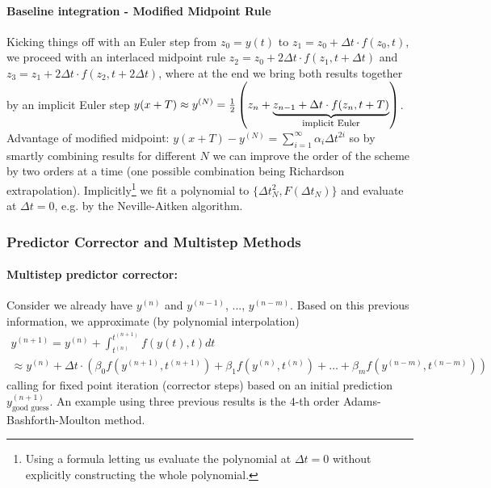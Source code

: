 \paragraph*{Baseline integration - Modified Midpoint Rule} Kicking things off with an Euler step from
$z_0 = y(t)$ to $z_1 = z_0 + \Delta t \cdot f(z_0, t)$, we proceed
with an interlaced midpoint rule $z_2 = z_0 + 2 \Delta t \cdot f(z_1, t + \Delta t)$ and
$z_3 = z_1 + 2 \Delta t \cdot f(z_2, t + 2 \Delta t)$, where at the end we bring
both results together by an implicit Euler step $y(x + T) \approx y^{(N)} = \frac{1}{2} \left(z_{n} + \explain{z_{n-1} + \Delta t \cdot f(z_n, t + T)}{implicit Euler}\right)$.
\textcolor{green1}{Advantage of modified midpoint:} $y(x+T) - y^{(N)} = \sum_{i=1}^{\infty} \alpha_i \Delta t^{2i}$
so by smartly combining results for different $N$ we can improve the order of the scheme by
two orders at a time (one possible combination being Richardson extrapolation). Implicitly\footnote{Using a formula
letting us evaluate the polynomial at $\Delta t = 0$ without explicitly constructing the whole polynomial.} we fit
a polynomial to $\{\Delta t_N^2, F(\Delta t_N)\}$ and evaluate at $\Delta t = 0$, e.g. by the
Neville-Aitken algorithm.

\subsubsection*{Predictor Corrector and Multistep Methods}
\paragraph*{Multistep predictor corrector:} Consider we already have $y^{(n)}$ and $y^{(n-1)}$, ..., $y^{(n-m)}$.
Based on this previous information, we approximate (by polynomial interpolation)
\begin{equation}
    \begin{gathered}
        y^{(n+1)} = y^{(n)} + \int_{t^{(n)}}^{t^{(n+1)}} f(y(t), t) dt \\
        \approx y^{(n)} + \Delta t \cdot \left( \beta_0 f\left(y^{(n + 1)}, t^{(n + 1)}\right) + \beta_1 f\left(y^{(n)}, t^{(n)}\right) + \dots + \beta_m f\left(y^{(n - m)}, t^{(n - m)}\right) \right)
    \end{gathered}
\end{equation}
calling for fixed point iteration (corrector steps) based on an initial prediction $y^{(n+1)}_{\text{good guess}}$.
An example using three previous results is the $4$-th order Adams-Bashforth-Moulton method.
